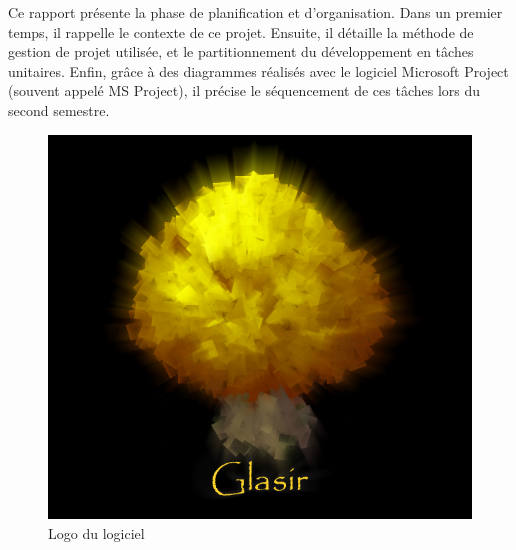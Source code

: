     Ce rapport présente la phase de planification et d'organisation. Dans un premier temps, il rappelle le contexte de ce projet. Ensuite, il détaille la méthode de gestion de projet utilisée, et le partitionnement du développement en tâches unitaires. Enfin, grâce à des diagrammes réalisés avec le logiciel Microsoft Project (souvent appelé MS Project), il précise le séquencement de ces tâches lors du second semestre.

    \begin{figure}[h!]
        \centering
        \includegraphics[height=0.4\textwidth]{figure/glasir.png}
        \caption{Logo du logiciel \glasir{}}
        \label{fig:glasir}
    \end{figure}